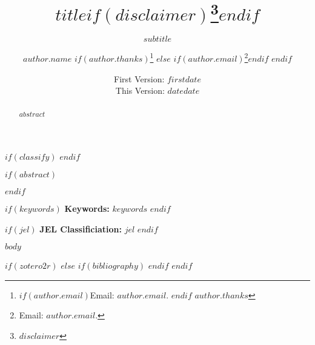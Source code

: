 \documentclass[$if(fontsize)$$fontsize$$else$11pt$endif$,$for(classoption)$$classoption$$sep$,$endfor$]{article}
\title{$title$$if(disclaimer)$\thanks{$disclaimer$}$endif$}
\subtitle{$subtitle$}
\author{$author.name$%
        $if(author.thanks)$\thanks{%
            $if(author.email)$Email: $author.email$. $endif$%
            $author.thanks$}%
        $else$%
            $if(author.email)$\thanks{Email:  $author.email$.}$endif$%
        $endif$}
\affil{$author.affil$}
\date{First Version:  $firstdate$ \\[0.5em] This Version:  $date$}
\date{$date$}
\begin{document}
\maketitle
\thispagestyle{fancy}
$if(classify)$
$endif$

$if(abstract)$
\begin{abstract}
$abstract$
\end{abstract}
\smallskip
$endif$

$if(keywords)$
\hspace{4mm}\textbf{Keywords:}  $keywords$
\smallskip
$endif$

$if(jel)$
\hspace{4mm}\textbf{JEL Classificiation:} $jel$
$endif$

\clearpage
{}
\fancyfoot[C]{\thepage}
\doublespacing
\raggedright
\setlength\parindent{4em}

$body$

$if(zotero2r)$
  \newpage
  \printbibliography
$else$
  $if(bibliography)$
    \newpage
    \printbibliography[title={References}]
  $endif$
$endif$
\end{document}
